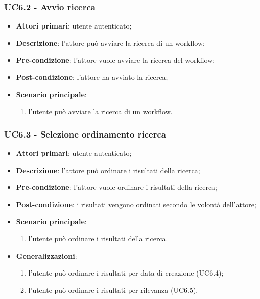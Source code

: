 \subsubsection{UC6.2 - Avvio ricerca}

\begin{itemize}
\item \textbf{Attori primari}: utente autenticato;

\item \textbf{Descrizione}:  l'attore può avviare la ricerca di un workflow;

\item \textbf{Pre-condizione}: l'attore vuole avviare la ricerca del workflow;

\item \textbf{Post-condizione}: l'attore ha avviato la ricerca;

\item \textbf{Scenario principale}:
\begin{enumerate}
\item l'utente può avviare la ricerca di un workflow.
\end{enumerate}
\end{itemize}

\subsubsection{UC6.3 - Selezione ordinamento ricerca}

\begin{itemize}
\item \textbf{Attori primari}: utente autenticato;

\item \textbf{Descrizione}:  l'attore può ordinare i risultati della ricerca;

\item \textbf{Pre-condizione}: l'attore vuole ordinare i risultati della ricerca;

\item \textbf{Post-condizione}: i risultati vengono ordinati secondo le volontà dell'attore;

\item \textbf{Scenario principale}:
\begin{enumerate}
\item l'utente può ordinare i risultati della ricerca.
\end{enumerate}

\item \textbf{Generalizzazioni}:
\begin{enumerate}
\item l'utente può ordinare i risultati per data di creazione (UC6.4);
\item l'utente può ordinare i risultati per rilevanza (UC6.5).
\end{enumerate}
\end{itemize}

